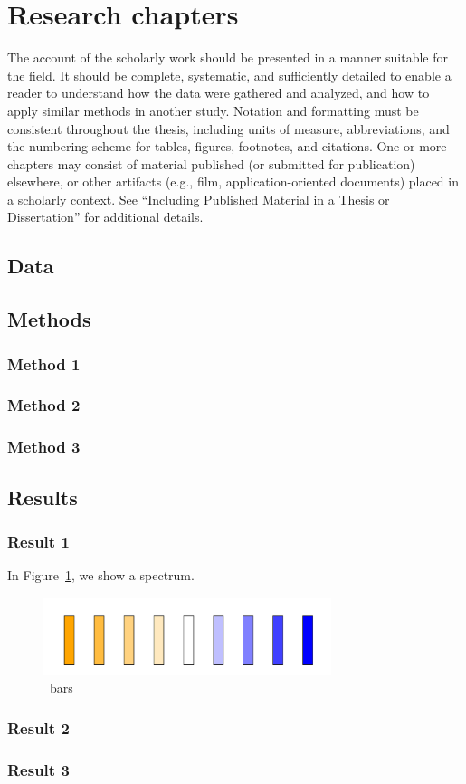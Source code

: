 \section{Research chapters}

The account of the scholarly work should be presented in a manner suitable for the field. It should be complete, systematic, and sufficiently detailed to enable a reader to understand how the data were gathered and analyzed, and how to apply similar methods in another study. Notation and formatting must be consistent throughout the thesis, including units of measure, abbreviations, and the numbering scheme for tables, figures, footnotes, and citations. One or more chapters may consist of material published (or submitted for publication) elsewhere, or other artifacts (e.g., film, application-oriented documents) placed in a scholarly context. See “Including Published Material in a Thesis or Dissertation” for additional details.

\subsection{Data}
\subsection{Methods}
\subsubsection{Method 1}
\subsubsection{Method 2}
\subsubsection{Method 3}
\subsection{Results}
\subsubsection{Result 1}

In Figure~\ref{fig:fig1}, we show a spectrum.

\begin{figure}[H]
  \centering
  \includegraphics[width=0.75\textwidth]{figures/fig1.png}
  \vspace{-.5em}
  \caption{\nbars~bars}
  \label{fig:fig1}
\end{figure}

\subsubsection{Result 2}
\subsubsection{Result 3}
